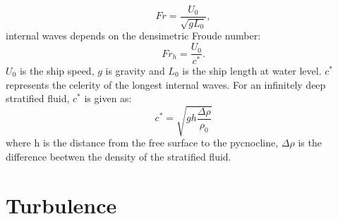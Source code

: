 \documentclass[a4paper, 12pt]{report}
\begin{document}
\begin{equation}
Fr = \frac{U_0}{\sqrt{gL_0}},
\label{eqn:FroudeNumber}
\end{equation} 
internal waves depends on the densimetric Froude number:
\begin{equation}
Fr_h = \frac{U_0}{c^*}.
\label{eqn:densimetricFroudeNumber}
\end{equation}
$U_0$ is the ship speed, $g$ is gravity and $L_0$ is the ship length at water level. $c^*$ represents the celerity of the longest internal waves. For an infinitely deep stratified fluid, $c^*$ is given as:
\begin{equation}
c^* = \sqrt{gh\frac{\Delta \rho}{\rho_0}}
\label{eqn:celerityWaves}
\end{equation} 
where h is the distance from the free surface to the pycnocline, $\Delta \rho$ is the difference beetwen the density of the stratified fluid.
\section{Turbulence}
\end{document}

